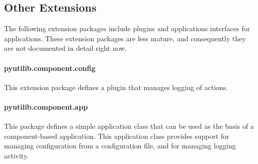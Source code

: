 \subsection{Other Extensions}

The following extension packages include plugins and applications interfaces for \pcasp applications.  These extension packages are less mature, and consequently they are not documented in detail right now.

\paragraph{pyutilib.component.config}  This extension package defines a plugin that manages logging of \pcasp actions.

\paragraph{pyutilib.component.app}  This package defines a simple application class that 
can be used as the basis of a component-based application.  This application class provides support for managing configuration from a configuration file, and for managing logging activity.




